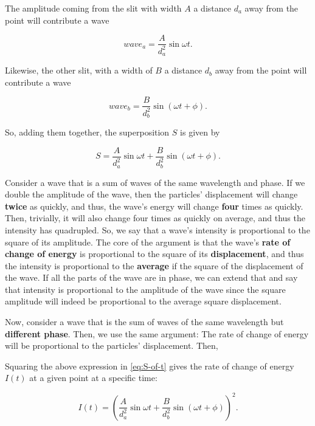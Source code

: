 \documentclass{paper}
\begin{document}
    
The amplitude coming from the slit with width $A$ a distance $d_a$ away from the point
will contribute a wave
            
\begin{equation*}
    wave_{a} = \frac{A}{d_{a}^{2}}\sin{\omega{}t}.
\end{equation*}
            
Likewise, the other slit, with a width of $B$ a distance $d_{b}$ away from the point
will contribute a wave 
            
\begin{equation*}
    wave_{b} = \frac{B}{d_{b}^{2}}\sin(\omega{}t + \phi).
\end{equation*}
            
So, adding them together, the superposition $S$ is given by
            
\begin{equation}
\label{eq:S-of-t}
    S = \frac{A}{d_{a}^{2}}\sin{\omega{}t} + \frac{B}{d_{b}^{2}}\sin(\omega{}t + \phi).
\end{equation}
    
Consider a wave that is a sum of waves of the same wavelength and phase. If we double the amplitude of the wave, then the particles' displacement will change \textbf{twice} as quickly, and thus, the wave's energy will change \textbf{four} times as quickly. Then, trivially, it will also change four times as quickly on average, and thus the intensity has quadrupled. So, we say that a wave's intensity is proportional to the square of its amplitude. The core of the argument is that the wave's \textbf{rate of change of energy} is proportional to the square of its \textbf{displacement}, and thus the intensity is proportional to the \textbf{average} if the square of the displacement of the wave. If all the parts of the wave are in phase, we can extend that and say that intensity is proportional to the amplitude of the wave since the square amplitude will indeed be proportional to the average square displacement.

Now, consider a wave that is the sum of waves of the same wavelength but \textbf{different phase}. Then, we use the same argument: The rate of change of energy will be proportional to the particles' displacement. Then,
            

Squaring the above expression in \eqref{eq:S-of-t} gives the rate of change of energy $I(t)$ at a given point at a specific time:
            
\begin{equation}
    \label{eq:superposition-intensity}
    I(t) = \left(\frac{A}{d_{a}^{2}}\sin{\omega{}t} + \frac{B}{d_{b}^{2}}\sin(\omega{}t + \phi)\right)^{2}.
\end{equation}
\end{document}

